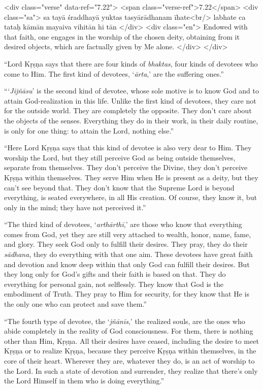 \begin{html}
<div class="verse" data-ref="7.22">
  <span class="verse-ref">7.22</span>
  <div class="sa">
    sa tayā śraddhayā yuktas tasyārādhanam īhate<br/>
    labhate ca tataḥ kāmān mayaiva vihitān hi tān
  </div>
  <div class="en">
    Endowed with that faith, one engages in the worship of the chosen deity, obtaining from it desired objects, which are factually given by Me alone.
  </div>
</div>
\end{html}



\enquote{Lord Kṛṣṇa says that there are four kinds of \textit{bhaktas}, four kinds of devotees who come to Him. The first kind of devotees, \enquote{\textit{ārta},} are the suffering ones.}

\enquote{\enquote{\textit{Jijñāsu}} is the second kind of devotee, whose sole motive is to know God and to attain God-realization in this life. Unlike the first kind of devotees, they care not for the outside world. They are completely the opposite. They don’t care about the objects of the senses. Everything they do in their work, in their daily routine, is only for one thing: to attain the Lord, nothing else.}

\enquote{Here Lord Kṛṣṇa says that this kind of devotee is also very dear to Him. They worship the Lord, but they still perceive God as being outside themselves, separate from themselves. They don’t perceive the Divine, they don’t perceive Kṛṣṇa within themselves. They serve Him when He is present as a deity, but they can’t see beyond that. They don’t know that the Supreme Lord is beyond everything, is seated everywhere, in all His creation. Of course, they know it, but only in the mind; they have not perceived it.}

\enquote{The third kind of devotees, \enquote{\textit{arthārthī},} are those who know that everything comes from God, yet they are still very attached to wealth, honor, name, fame, and glory. They seek God only to fulfill their desires. They pray, they do their \textit{sādhana}, they do everything with that one aim. These devotees have great faith and devotion and know deep within that only God can fulfill their desires. But they long only for God’s gifts and their faith is based on that. They do everything for personal gain, not selflessly. They know that God is the embodiment of Truth. They pray to Him for security, for they know that He is the only one who can protect and save them.}

\enquote{The fourth type of devotee, the \enquote{\textit{jñānīs},} the realized souls, are the ones who abide completely in the reality of God consciousness. For them, there is nothing other than Him, Kṛṣṇa. All their desires have ceased, including the desire to meet Kṛṣṇa or to realize Kṛṣṇa, because they perceive Kṛṣṇa within themselves, in the core of their heart. Wherever they are, whatever they do, is an act of worship to the Lord. In such a state of devotion and surrender, they realize that there’s only the Lord Himself in them who is doing everything.}

